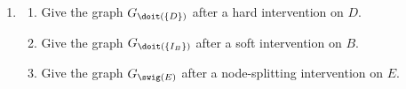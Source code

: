 \begin{enumerate}
\begin{enumerate}
\begin{enumerate}
      \item Give $G^{\setminus \{C,E,D\}}$.
    \end{enumerate}
    Check that your answers agree with Lemma \ref*{marginalizations-commute}.
    \item
    \begin{enumerate}
      \item Give the graph $G_{\doit(\{D\})}$ after a hard intervention on $D$.
      \item Give the graph $G_{\doit(\{I_B\})}$ after a soft intervention on $B$.
      \item Give the graph $G_{\swig(E)}$ after a node-splitting intervention on $E$.
    \end{enumerate}
  \end{enumerate}


\end{enumerate}
